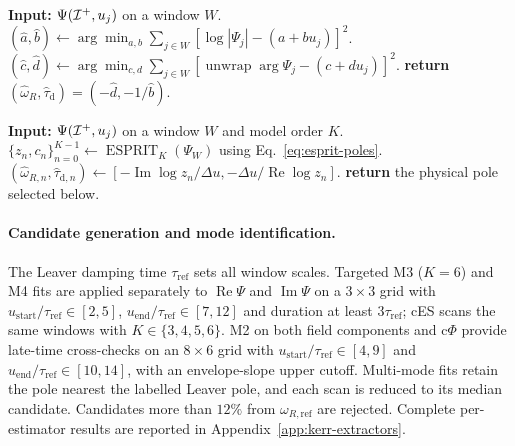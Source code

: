 \begin{algorithm}[H]
\caption{c$\Phi$ complex-phase estimator.}
\label{alg:cphi}
\begin{algorithmic}[1]
\STATE \textbf{Input:} $\Psi(\mathcal{I}^{+},u_j)$ on a window $W$.
\STATE $(\widehat a,\widehat b)\gets
  \arg\min_{a,b}\sum_{j\in W}[\log|\Psi_j|-(a+b u_j)]^2$.
\STATE $(\widehat c,\widehat d)\gets
  \arg\min_{c,d}\sum_{j\in W}
  [\operatorname{unwrap}\arg\Psi_j-(c+d u_j)]^2$.
\STATE \textbf{return}
  $(\widehat\omega_R,\widehat\tau_{\mathrm d})
  =(-\widehat d,-1/\widehat b)$.
\end{algorithmic}
\end{algorithm}

\begin{algorithm}[H]
\caption{cES complex ESPRIT estimator.}
\label{alg:ces}
\begin{algorithmic}[1]
\STATE \textbf{Input:} $\Psi(\mathcal{I}^{+},u_j)$ on a window $W$ and
       model order $K$.
\STATE $\{z_n,c_n\}_{n=0}^{K-1}\gets\operatorname{ESPRIT}_K(\Psi_W)$
       using Eq.~\eqref{eq:esprit-poles}.
\STATE $(\widehat\omega_{R,n},\widehat\tau_{\mathrm d,n})\gets
  [-\operatorname{Im}\log z_n/\Delta u,
  -\Delta u/\operatorname{Re}\log z_n]$.
\STATE \textbf{return} the physical pole selected below.
\end{algorithmic}
\end{algorithm}

\paragraph{Candidate generation and mode identification.} The Leaver
damping time $\tau_{\mathrm{ref}}$ sets all window scales. Targeted M3
($K=6$) and M4 fits are applied separately to
$\operatorname{Re}\Psi$ and $\operatorname{Im}\Psi$ on a
$3\times3$ grid with
$u_{\mathrm{start}}/\tau_{\mathrm{ref}}\in[2,5]$,
$u_{\mathrm{end}}/\tau_{\mathrm{ref}}\in[7,12]$ and duration at
least $3\tau_{\mathrm{ref}}$; cES scans the same windows with
$K\in\{3,4,5,6\}$. M2 on both field components and c$\Phi$ provide
late-time cross-checks on an $8\times6$ grid with
$u_{\mathrm{start}}/\tau_{\mathrm{ref}}\in[4,9]$ and
$u_{\mathrm{end}}/\tau_{\mathrm{ref}}\in[10,14]$, with an
envelope-slope upper cutoff. Multi-mode fits retain the pole nearest
the labelled Leaver pole, and each scan is reduced to its median
candidate. Candidates more than $12\%$ from
$\omega_{R,\mathrm{ref}}$ are rejected. Complete per-estimator
results are reported in Appendix~\ref{app:kerr-extractors}.
